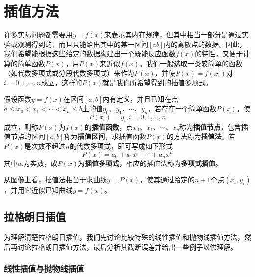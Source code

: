\chapter{插值方法}

许多实际问题都需要用$y=f(x)$来表示其内在规律，但其中相当一部分是通过实验或观测得到的，而且只能给出其中的某一区间$[ab]$内的离散点的数据。因此，我们希望能根据这些给定的数据构建出一个既能反应函数$f(x)$的特性，又便于计算的简单函数$P(x)$，用$P(x)$来近似$f(x)$。我们一般选取一类较简单的函数（如代数多项式或分段代数多项式）来作为$P(x)$，并使$P(x)=f(x_i)$对$i=0,1,\cdots,n$成立，这样的$P(x)$就是我们所希望得到的插值多项式。

假设函数$y=f(x)$在区间$[a,b]$内有定义，并且已知在点$a \leqslant x_0 < x_1 < \cdots < x_n \leqslant b$上的值$y_0$、$y_1$、$\cdots$、$y_n$，若存在一个简单函数$P(x)$，使
\begin{equation}
    P(x_i) = y_i,	i=0,1,\cdots,n
\end{equation} 
成立，则称$P(x)$为$f(x)$的\textbf{插值函数}，点$x_0$、$x_1$、$\cdots$、$x_n$称为\textbf{插值节点}，包含插值节点的区间$[a,b]$称为\textbf{插值区间}，求插值函数$P(x)$的方法称为\textbf{插值法}。若$P(x)$是次数不超过$n$的代数多项式，即可写成如下形式
\begin{equation}
	P(x)=a_0 + a_1 x + \cdots + a_n x^n
\end{equation} 
其中$a_i$为实数，成$P(x)$为\textbf{插值多项式}，相应的插值法称为\textbf{多项式插值}。

从图像上看，插值法相当于求曲线$y=P(x)$，使其通过给定的$n+1$个点$(x_i, y_i)$，并用它近似已知曲线$y=f(x)$。
\section{拉格朗日插值}
为理解清楚拉格朗日插值，我们先讨论比较特殊的线性插值和抛物线插值方法，然后再讨论拉格朗日插值方法，最后分析其截断误差并给出一些例子以供理解。
\subsection{线性插值与抛物线插值}


